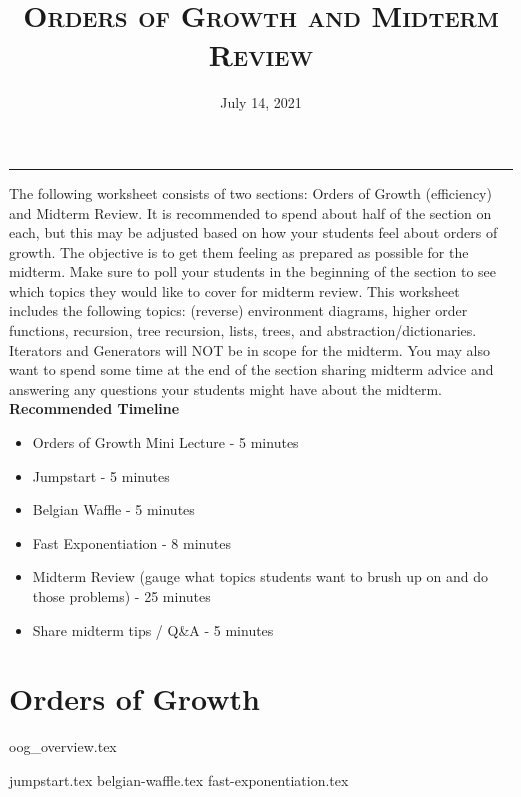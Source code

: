 \documentclass{exam}
\title{\textsc{Orders of Growth and Midterm Review}}
\date{July 14, 2021}
\begin{document}
\maketitle
\rule{\textwidth}{0.15em}
\fontsize{12}{15}\selectfont


\begin{guide}
    The following worksheet consists of two sections: Orders of Growth (efficiency) and Midterm Review.
    It is recommended to spend about half of the section on each, but this may be adjusted based on how your
    students feel about orders of growth. The objective is to get them feeling as prepared as possible for the midterm.
    \newline\newline
    Make sure to poll your students in the beginning of the section to see which topics they would like to cover for midterm review.
    This worksheet includes the following topics: (reverse) environment diagrams, higher order functions, recursion, tree recursion, lists, trees, and abstraction/dictionaries.
    Iterators and Generators will NOT be in scope for the midterm. You may also want to spend some time at the end of the section sharing midterm advice and answering any questions
    your students might have about the midterm.
    \textbf{Recommended Timeline}
    \begin{itemize}
        \item Orders of Growth Mini Lecture - 5 minutes
        \item Jumpstart - 5 minutes
        \item Belgian Waffle - 5 minutes
        \item Fast Exponentiation - 8 minutes
        \item Midterm Review (gauge what topics students want to brush up on and do those problems) - 25 minutes
        \item Share midterm tips / Q\&A - 5 minutes
    \end{itemize}
\end{guide}

\section{Orders of Growth}
{oog_overview.tex}
\begin{questions}
{jumpstart.tex}
{belgian-waffle.tex}
{fast-exponentiation.tex}
\end{questions}
\end{document}
